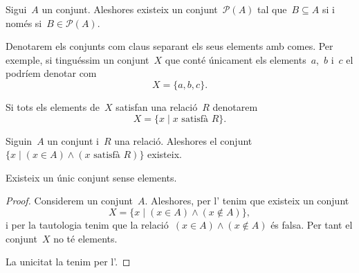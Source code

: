 \documentclass[../fonaments-de-les-matematiques.tex]{subfiles}
\begin{document}
    \begin{axiom}
        \label{axiom:conjunt-potencia}
        Sigui~\(A\) un conjunt.
        Aleshores existeix un conjunt~\(\mathcal{P}(A)\) tal que~\(B\subseteq A\) si i només si~\(B\in\mathcal{P}(A)\).
    \end{axiom}
    \begin{notation}
        Denotarem els conjunts com claus separant els seus elements amb comes.
        Per exemple, si tinguéssim un conjunt~\(X\) que conté únicament els elements~\(a\),~\(b\) i~\(c\) el podríem denotar com
        \[
            X=\{a,b,c\}.
        \]

        Si tots els elements de~\(X\) satisfan una relació~\(R\) denotarem
        \[
            X=\{x\mid x\text{ satisfà }R\}.
        \]
    \end{notation}
    \begin{axiom}
        \label{axiom:axioma-de-separacio}
        Siguin~\(A\) un conjunt i~\(R\) una relació.
        Aleshores el conjunt~\(\{x\mid(x\in A)\land(x\text{ satisfà }R)\}\) existeix.
    \end{axiom}
    \begin{proposition}
        \label{prop:conjunt-buit}
        Existeix un únic conjunt sense elements.
    \end{proposition}
    \begin{proof}
        Considerem un conjunt~\(A\).
        Aleshores, per l' tenim que existeix un conjunt
        \[
            X=\{x\mid(x\in A)\land(x\notin A)\},
        \]
        i per la tautologia  tenim que la relació~\((x\in A)\land(x\notin A)\) és falsa.
        Per tant el conjunt~\(X\) no té elements.

        La unicitat la tenim per l'.
    \end{proof}
\end{document}
